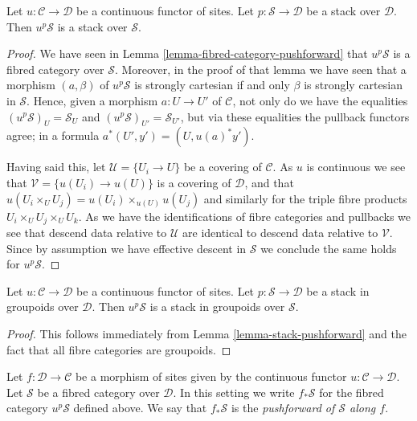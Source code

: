 \begin{lemma}
\label{lemma-stack-pushforward}
Let $u : \mathcal{C} \to \mathcal{D}$ be a continuous functor of sites.
Let $p : \mathcal{S} \to \mathcal{D}$ be a stack over $\mathcal{D}$.
Then $u^p\mathcal{S}$ is a stack over $\mathcal{S}$.
\end{lemma}

\begin{proof}
We have seen in
Lemma \ref{lemma-fibred-category-pushforward}
that $u^p\mathcal{S}$ is a fibred category over $\mathcal{S}$.
Moreover, in the proof of that lemma we have seen that a morphism
$(a, \beta)$ of $u^p\mathcal{S}$ is strongly cartesian if and
only $\beta$ is strongly cartesian in $\mathcal{S}$. Hence,
given a morphism $a : U \to U'$ of $\mathcal{C}$, not only
do we have the equalities
$(u^p\mathcal{S})_U = \mathcal{S}_U$ and
$(u^p\mathcal{S})_{U'} = \mathcal{S}_{U'}$, but via these
equalities the pullback functors agree; in a formula
$a^*(U', y') = (U, u(a)^*y')$.

\medskip\noindent
Having said this, let $\mathcal{U} = \{U_i \to U\}$ be a covering
of $\mathcal{C}$. As $u$ is continuous we see that
$\mathcal{V} = \{u(U_i) \to u(U)\}$ is a covering of $\mathcal{D}$,
and that $u(U_i \times_U U_j) = u(U_i) \times_{u(U)} u(U_j)$ and
similarly for the triple fibre products $U_i \times_U U_j \times_U U_k$.
As we have the identifications of fibre categories and pullbacks
we see that descend data relative to $\mathcal{U}$ are identical
to descend data relative to $\mathcal{V}$. Since by assumption we have
effective descent in $\mathcal{S}$ we conclude the same holds for
$u^p\mathcal{S}$.
\end{proof}

\begin{lemma}
\label{lemma-stack-in-groupoids-pushforward}
Let $u : \mathcal{C} \to \mathcal{D}$ be a continuous functor of sites.
Let $p : \mathcal{S} \to \mathcal{D}$ be a stack in groupoids
over $\mathcal{D}$. Then $u^p\mathcal{S}$ is a stack in groupoids
over $\mathcal{S}$.
\end{lemma}

\begin{proof}
This follows immediately from
Lemma \ref{lemma-stack-pushforward}
and the fact that all fibre categories are groupoids.
\end{proof}

\begin{definition}
\label{definition-pushforward-stack}
Let $f : \mathcal{D} \to \mathcal{C}$ be a morphism of sites
given by the continuous functor $u : \mathcal{C} \to \mathcal{D}$.
Let $\mathcal{S}$ be a fibred category over $\mathcal{D}$.
In this setting we write {\it $f_*\mathcal{S}$} for the fibred
category $u^p\mathcal{S}$ defined above. We say that
$f_*\mathcal{S}$ is the {\it pushforward of $\mathcal{S}$ along $f$}.
\end{definition}

